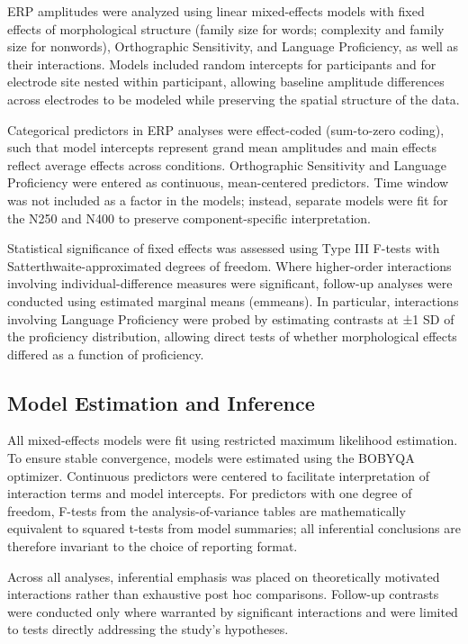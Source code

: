 \documentclass[preprint,12pt, authoryear, review]{elsarticle}
\begin{document}
ERP amplitudes were analyzed using linear mixed-effects models with fixed effects of morphological structure (family size for words; complexity and family size for nonwords), Orthographic Sensitivity, and Language Proficiency, as well as their interactions. Models included random intercepts for participants and for electrode site nested within participant, allowing baseline amplitude differences across electrodes to be modeled while preserving the spatial structure of the data.

Categorical predictors in ERP analyses were effect-coded (sum-to-zero coding), such that model intercepts represent grand mean amplitudes and main effects reflect average effects across conditions. Orthographic Sensitivity and Language Proficiency were entered as continuous, mean-centered predictors. Time window was not included as a factor in the models; instead, separate models were fit for the N250 and N400 to preserve component-specific interpretation.

Statistical significance of fixed effects was assessed using Type III F-tests with Satterthwaite-approximated degrees of freedom. Where higher-order interactions involving individual-difference measures were significant, follow-up analyses were conducted using estimated marginal means (emmeans). In particular, interactions involving Language Proficiency were probed by estimating contrasts at ±1 SD of the proficiency distribution, allowing direct tests of whether morphological effects differed as a function of proficiency.

\subsection{Model Estimation and Inference}

All mixed-effects models were fit using restricted maximum likelihood estimation. To ensure stable convergence, models were estimated using the BOBYQA optimizer. Continuous predictors were centered to facilitate interpretation of interaction terms and model intercepts. For predictors with one degree of freedom, F-tests from the analysis-of-variance tables are mathematically equivalent to squared t-tests from model summaries; all inferential conclusions are therefore invariant to the choice of reporting format.

Across all analyses, inferential emphasis was placed on theoretically motivated interactions rather than exhaustive post hoc comparisons. Follow-up contrasts were conducted only where warranted by significant interactions and were limited to tests directly addressing the study’s hypotheses.
\end{document}
